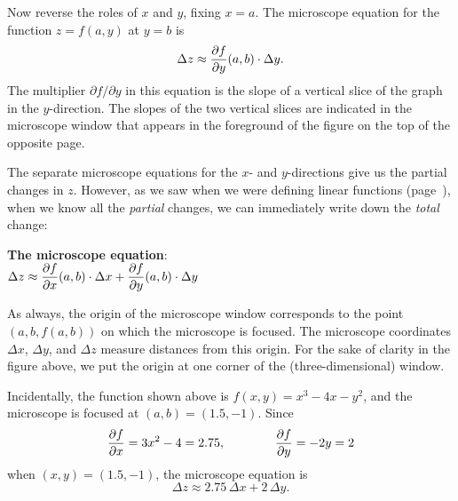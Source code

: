 {{{{	Now  reverse the roles of $x$ and $y$, fixing $x = a$.  The microscope equation for the function $z = f(a, y)$ 
at $y = b$ is
	\[
\Delta z \approx {\partial f \over \partial y}(a, b) \cdot \Delta y.
\]
The multiplier $\partial f/\partial y$ in this equation is the slope of a vertical slice of the graph in the $y$-direction.  The slopes of the two vertical slices are indicated in the microscope window that appears in the foreground of the figure on the top of the opposite page.  

\newpage

\mbox{}

\vspace{-30pt}
\vspace{268pt}

	The separate microscope equations 
for the $x$- and $y$-directions give us the partial changes in $z$.  However, as we saw when we were defining linear functions (page~\pageref{altdef}), when we know all the {\em partial\/} changes, we can immediately write down the {\em total\/} change:
\begin{observation}

{\bf The microscope equation}: \\
$\Delta z \approx 
	{\displaystyle{\partial f \over \partial x}(a, b) \cdot \Delta x}
	+ {\displaystyle{\partial f \over \partial y}(a, b) \cdot \Delta y}$
\end{observation}

	As always, the origin of the microscope window corresponds to the point $(a, b, f(a, b))$ on which the microscope is focused.  The microscope coordinates $\Delta x$, $\Delta y$, and $\Delta z$ measure distances from this origin.  For the sake of clarity in the figure above, we put the origin at one corner of the (three-dimensional) window. 

	Incidentally, the function shown above is $f(x, y) = x^3 - 4x - y^2$, 
and the microscope is focused at $(a, b) = (1.5, -1)$.  Since
	\[
{\partial f \over \partial x} = 3 x^2 - 4 = 2.75, \qquad \qquad
		{\partial f \over \partial y} = -2 y = 2
\]
when $(x, y) = (1.5, -1)$, the microscope equation is
	\[
\Delta z \approx 2.75 \, \Delta x + 2 \, \Delta y.
\]

}}}}

